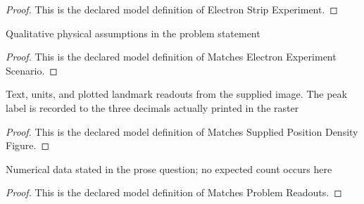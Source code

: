 \begin{proof}
  This is the declared model definition of Electron Strip Experiment.
\end{proof}
\begin{definition}
  \label{def:physics:phyx-mini-0645:phyxminiproblems-problemphyxmini0645-matcheselectronexperimentscenario}
  Qualitative physical assumptions in the problem statement
\end{definition}
\begin{proof}
  This is the declared model definition of Matches Electron Experiment Scenario.
\end{proof}
\begin{definition}
  \label{def:physics:phyx-mini-0645:phyxminiproblems-problemphyxmini0645-matchessuppliedpositiondensityfigure}
  Text, units, and plotted landmark readouts from the supplied image. The peak label is recorded to the three decimals actually printed in the raster
\end{definition}
\begin{proof}
  This is the declared model definition of Matches Supplied Position Density Figure.
\end{proof}
\begin{definition}
  \label{def:physics:phyx-mini-0645:phyxminiproblems-problemphyxmini0645-matchesproblemreadouts}
  Numerical data stated in the prose question; no expected count occurs here
\end{definition}
\begin{proof}
  This is the declared model definition of Matches Problem Readouts.
\end{proof}

